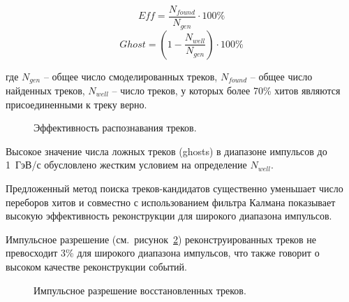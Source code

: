 \documentclass[a4paper, 12pt]{extreport}  %
\begin{document}
$$Eff = \frac{N_{found}}{N_{gen}} \cdot 100\%$$
$$Ghost = (1 - \frac{N_{well}}{N_{gen}}) \cdot 100\%$$

где $N_{gen}$ -- общее число смоделированных треков, $N_{found}$ -- общее число
найденных треков, $N_{well}$ -- число треков, у которых более 70\% хитов
являются присоединенными к треку верно.

\begin{figure}[h!]
\caption{Эффективность распознавания треков.}
\label{img:efficiency}
\end{figure}

Высокое значение числа ложных треков (ghosts) в диапазоне импульсов до 1~ГэВ/с
обусловлено жестким условием на определение $N_{well}$.

Предложенный метод поиска треков-кандидатов существенно уменьшает число
переборов хитов и совместно с использованием фильтра Калмана показывает высокую
эффективность реконструкции для широкого диапазона импульсов.

Импульсное разрешение (см.~рисунок~\ref{img:res}) реконструированных треков не
превосходит 3\% для широкого диапазона импульсов, что также говорит о высоком
качестве реконструкции событий.

\begin{figure}[h!]
\caption{Импульсное разрешение восстановленных треков.}
\label{img:res}
\end{figure}
\end{document}

